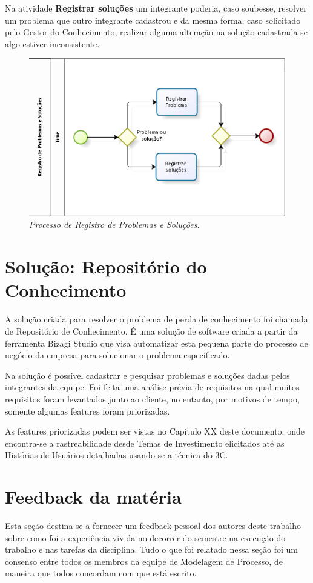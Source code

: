 Na atividade \textbf{Registrar soluções} um integrante poderia, caso soubesse, resolver um problema que outro integrante cadastrou e da mesma forma, caso solicitado pelo Gestor do Conhecimento, realizar alguma alteração na solução cadastrada se algo estiver inconsistente.

\begin{figure}[H]
\centering\includegraphics[scale=0.5]{figuras/processoDoBizagi.png}
\caption{\textit{Processo de Registro de Problemas e Soluções.}}
\end{figure}

\section{Solução: Repositório do Conhecimento}
A solução criada para resolver o problema de perda de conhecimento foi chamada de Repositório de Conhecimento. É uma solução de software criada a partir da ferramenta Bizagi Studio que visa automatizar esta pequena parte do processo de negócio da empresa para solucionar o problema especificado. 

Na solução é possível cadastrar e pesquisar problemas e soluções dadas pelos integrantes da equipe. Foi feita uma análise prévia de requisitos na qual muitos requisitos foram levantados junto ao cliente, no entanto, por motivos de tempo, somente algumas features foram priorizadas. 

As features priorizadas podem ser vistas no Capítulo XX deste documento, onde encontra-se a rastreabilidade desde Temas de Investimento elicitados até as Histórias de Usuários detalhadas usando-se a técnica do 3C.

\section{Feedback da matéria}
Esta seção destina-se a fornecer um feedback pessoal dos autores deste trabalho sobre como foi a experiência vivida no decorrer do semestre na execução do trabalho e nas tarefas da disciplina. Tudo o que foi relatado nessa seção foi um consenso entre todos os membros da equipe de Modelagem de Processo, de maneira que todos concordam com que está escrito. 


